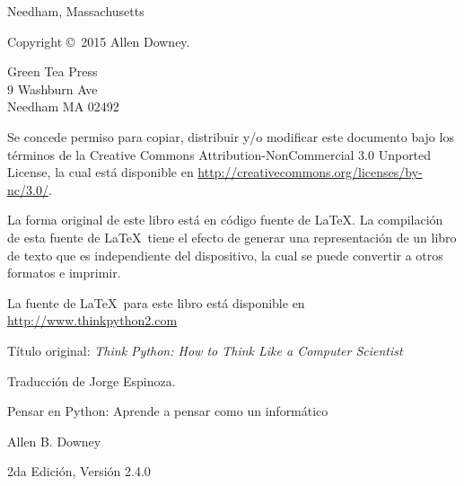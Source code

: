 \documentclass[10pt]{book}
\newcommand{\thetitle}{Pensar en Python: Aprende a pensar como un informático}
\newcommand{\theversion}{2da Edición, Versión 2.4.0}
\newcommand{\thedate}{}
\begin{document}
\begin{latexonly}
\begin{flushright}
{\small Needham, Massachusetts}

\vfill

\end{flushright}


\pagebreak
\thispagestyle{empty}

{\small
Copyright \copyright ~2015 Allen Downey.


\vspace{0.2in}

\begin{flushleft}
Green Tea Press       \\
9 Washburn Ave        \\
Needham MA 02492
\end{flushleft}

Se concede permiso para copiar, distribuir y/o modificar este documento
bajo los términos de la Creative Commons Attribution-NonCommercial
3.0 Unported License, la cual está disponible en \url{http://creativecommons.org/licenses/by-nc/3.0/}.

La forma original de este libro está en código fuente de \LaTeX.  La compilación
de esta fuente de \LaTeX\ tiene el efecto de generar una representación de un libro
de texto que es independiente del dispositivo, la cual se puede convertir a otros formatos
e imprimir.

La fuente de \LaTeX\ para este libro está disponible en
\url{http://www.thinkpython2.com}

Título original: {\em Think Python: How to Think Like a Computer Scientist}

Traducción de Jorge Espinoza.

\vspace{0.2in}

} %

\end{latexonly}



\begin{htmlonly}


{\Large \thetitle}

{\large Allen B. Downey}

\theversion

\thedate

\setcounter{chapter}{-1}

\end{htmlonly}
\end{document}
